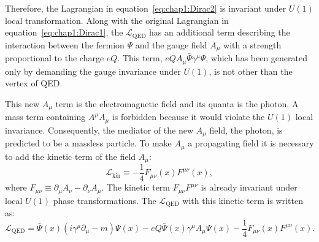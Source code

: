 Therefore, the Lagrangian in equation~\ref{eq:chap1:Dirac2} is invariant under $U(1)$ local transformation. 
Along with the original Lagrangian in equation~\ref{eq:chap1:Dirac1}, the $\mathcal{L}_{\text{QED}}$ has an additional term describing the interaction 
between the fermion $\Psi$ and the gauge field $A_{\mu}$ with a strength proportional to the charge $eQ$. 
This term, $eQA_{\mu}\bar{\Psi}\gamma^{\mu}\Psi$, which has been generated only by demanding the gauge invariance
under $U(1)$, is not other than the vertex of QED. %

This new $A_{\mu}$ term is the electromagnetic field and its quanta is the photon.
A mass term containing $A^{\mu}A_{\mu}$ is forbidden because it would violate the $U(1)$ local invariance. 
Consequently, the mediator of the new $A_{\mu}$ field, the photon, is predicted to be a massless particle. 
To make $A_{\mu}$ a propagating field it is necessary to add the kinetic term of the field $A_{\mu}$:
\begin{equation}\label{eq:chap1:QED_Kin}
	\mathcal{L}_{\text{kin}} \equiv - \frac{1}{4}F_{\mu \nu}(x) F^{\mu \nu}(x),
\end{equation}
where $F_{\mu \nu} \equiv \partial_{\mu} A_{\nu} -\partial_{\nu} A_{\mu}$. 
The kinetic term  $F_{\mu \nu} F^{\mu \nu}$ is already invariant under local $U(1)$ phase transformations.
The $\mathcal{L}_{\text{QED}}$  with this kinetic term is written as:
\begin{equation}\label{eq:chap1:QED_Complete}
	\mathcal{L}_{\text{QED}} =  \bar{\Psi}(x) (i  \gamma^{\mu} \partial_{\mu} - m ) \Psi(x) - eQ \bar{\Psi}(x) \gamma^{\mu}A_{\mu} \Psi(x) - \frac{1}{4}F_{\mu \nu}(x) F^{\mu \nu}(x).
\end{equation}


